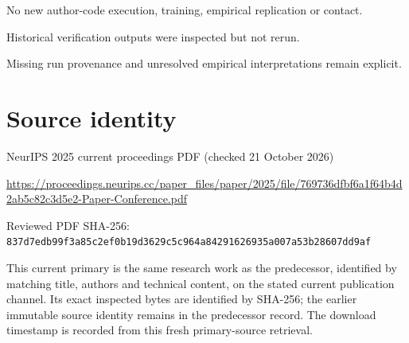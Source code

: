 \documentclass[11pt]{article}
\begin{document}
No new author-code execution, training, empirical replication or contact.\par

Historical verification outputs were inspected but not rerun.\par

Missing run provenance and unresolved empirical interpretations remain explicit.\par

\section*{Source identity}

NeurIPS 2025 current proceedings PDF (checked 21 October 2026)

\url{https://proceedings.neurips.cc/paper_files/paper/2025/file/769736dfbf6a1f64b4d2ab5c82c3d5e2-Paper-Conference.pdf}

Reviewed PDF SHA-256: \nolinkurl{837d7edb99f3a85c2ef0b19d3629c5c964a84291626935a007a53b28607dd9af}

This current primary is the same research work as the predecessor, identified by matching title, authors and technical content, on the stated current publication channel. Its exact inspected bytes are identified by SHA-256; the earlier immutable source identity remains in the predecessor record. The download timestamp is recorded from this fresh primary-source retrieval.
\end{document}
